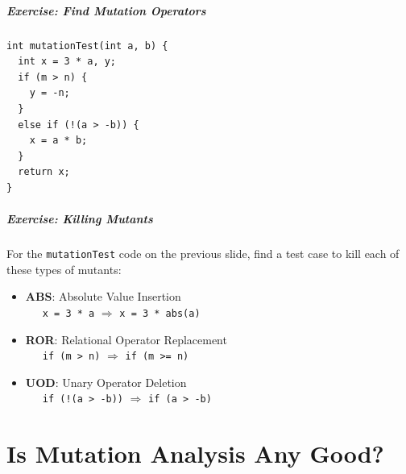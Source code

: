 \documentclass{beamer}
\newenvironment{changemargin}[1]{%
  \begin{list}{}{%
    \setlength{\topsep}{0pt}%
    \setlength{\leftmargin}{#1}%
    \setlength{\rightmargin}{1em}
    \setlength{\listparindent}{\parindent}%
    \setlength{\itemindent}{\parindent}%
    \setlength{\parsep}{\parskip}%
  }%
  \item[]}{\end{list}}
\begin{document}
\begin{frame}[fragile]
  \frametitle{Exercise: Find Mutation Operators}

  \begin{changemargin}{2em}
\begin{lstlisting}
int mutationTest(int a, b) { 
  int x = 3 * a, y;
  if (m > n) {
    y = -n;
  }
  else if (!(a > -b)) {
    x = a * b;
  }
  return x;
}
\end{lstlisting}
  \end{changemargin}
  
\end{frame}

\begin{frame}[fragile]
  \frametitle{Exercise: Killing Mutants}

  \begin{changemargin}{2em}
    For the \texttt{mutationTest} code on the previous slide, find a test case to kill each of these types of mutants:\\[0.5em]
    \begin{itemize}
\item {\bf ABS}: Absolute Value Insertion\\
~~~{\tt x = 3 * a}
$\Longrightarrow$ {\tt x = 3 * abs(a)}\\[.5em]
\item {\bf ROR}: Relational Operator Replacement\\
~~~{\tt if (m > n)} $\Longrightarrow$ {\tt if (m >= n)}\\[.5em]
\item {\bf UOD}: Unary Operator Deletion\\
~~~{\tt if (!(a > -b))} $\Longrightarrow$ {\tt if (a > -b)}\\[.5em]
    \end{itemize}
  \end{changemargin}
\end{frame}


\part{Is Mutation Analysis Any Good?}
\begin{frame}
  \partpage
\end{frame}
\end{document}
